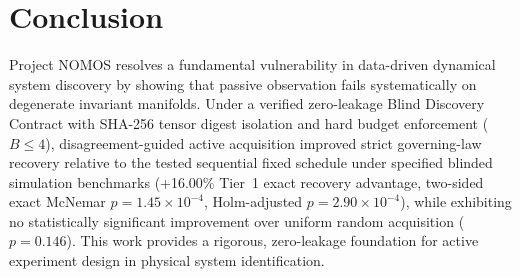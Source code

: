 \documentclass[twocolumn,10pt,a4paper]{article}
\begin{document}
\section{Conclusion}
Project NOMOS resolves a fundamental vulnerability in data-driven dynamical system discovery by showing that passive observation fails systematically on degenerate invariant manifolds. Under a verified zero-leakage Blind Discovery Contract with SHA-256 tensor digest isolation and hard budget enforcement ($B \le 4$), disagreement-guided active acquisition improved strict governing-law recovery relative to the tested sequential fixed schedule under specified blinded simulation benchmarks (+16.00\% Tier~1 exact recovery advantage, two-sided exact McNemar $p = 1.45 \times 10^{-4}$, Holm-adjusted $p = 2.90 \times 10^{-4}$), while exhibiting no statistically significant improvement over uniform random acquisition ($p = 0.146$). This work provides a rigorous, zero-leakage foundation for active experiment design in physical system identification.



\end{document}
